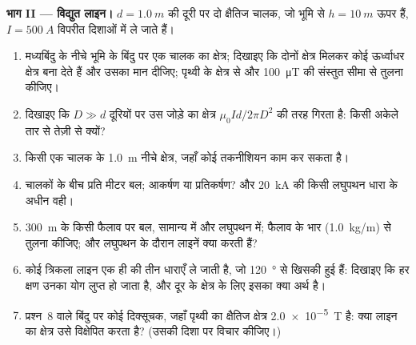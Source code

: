 \begin{problem}[{सप्ताहांत समस्या --- किसी समाक्ष तार पर ऐंपियर का नियम,
किसी विद्युत लाइन पर लाप्लास बल, और किसी चल-कुंडली धारामापी का
अभिकल्प}]
\medskip
\noindent\textbf{भाग II --- विद्युत लाइन।}
$d = \qty{1.0}{m}$ की दूरी पर दो क्षैतिज चालक, जो भूमि से
$h = \qty{10}{m}$ ऊपर हैं, $I = \qty{500}{A}$ विपरीत दिशाओं में ले जाते हैं।
\begin{enumerate}[resume]
  \item मध्यबिंदु के नीचे भूमि के बिंदु पर एक चालक का क्षेत्र; दिखाइए कि
        दोनों क्षेत्र मिलकर कोई ऊर्ध्वाधर क्षेत्र बना देते हैं और उसका मान
        दीजिए; पृथ्वी के क्षेत्र से और \qty{100}{\micro T} की
        संस्तुत सीमा से तुलना कीजिए।
  \item दिखाइए कि $D \gg d$ दूरियों पर उस जोड़े का क्षेत्र
        $\mu_0Id/2\pi D^2$ की तरह गिरता है: किसी अकेले तार से तेज़ी से
        क्यों?
  \item किसी एक चालक के \qty{1.0}{m} नीचे क्षेत्र, जहाँ कोई तकनीशियन काम
        कर सकता है।
  \item चालकों के बीच प्रति मीटर बल; आकर्षण या प्रतिकर्षण? और
        \qty{20}{kA} की किसी लघुपथन धारा के अधीन वही।
  \item \qty{300}{m} के किसी फैलाव पर बल, सामान्य में और लघुपथन में;
        फैलाव के भार (\qty{1.0}{kg/m}) से तुलना कीजिए; और लघुपथन के दौरान
        लाइनें क्या करती हैं?
  \item कोई त्रिकला लाइन एक ही  की तीन धाराएँ ले जाती है, जो
        \qty{120}{\degree} से खिसकी हुई हैं: दिखाइए कि हर क्षण उनका योग
        लुप्त हो जाता है, और दूर के क्षेत्र के लिए इसका क्या अर्थ है।
  \item प्रश्न~8 वाले बिंदु पर कोई दिक्सूचक, जहाँ पृथ्वी का क्षैतिज
        क्षेत्र \qty{2.0e-5}{T} है: क्या लाइन का क्षेत्र उसे विक्षेपित
        करता है? (उसकी दिशा पर विचार कीजिए।)
\end{enumerate}


\end{problem}
